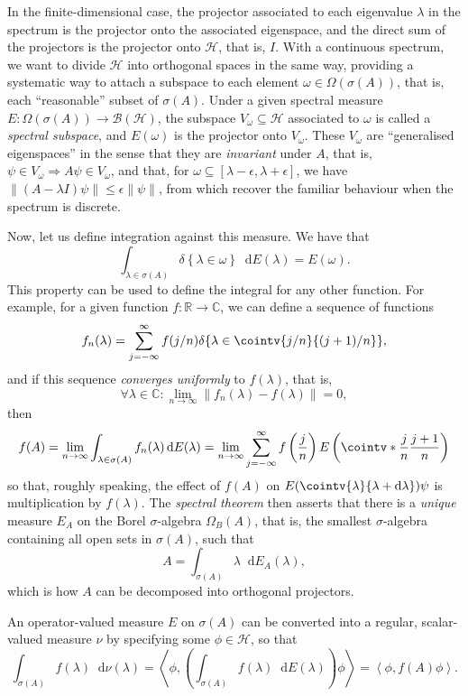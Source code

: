 \documentclass[10pt, a4paper]{article}
\numberwithin{equation}{section} %
\theoremstyle{definition}
\theoremstyle{plain}
\newcommand{\norm}[1]{\left\lVert#1\right\rVert}
\newcommand{\dif}{\mathop{}\!\mathrm{d}} %
\newcommand{\?}{\mathrel{?}} %
\newcommand{\R}{\mathbb{R}} %
\newcommand{\C}{\mathbb{C}} %
\newcommand{\angleb}[1]{\left\langle #1 \right\rangle} %
\newcommand{\indic}[1]{\delta{\left\{#1\right\}}} %
\newcommand{\Hs}{\mathcal{H}} %
\begin{document}
\begin{appendices}
      In the finite-dimensional case, the projector associated to each eigenvalue \(\lambda\) in the spectrum is the projector onto the associated eigenspace, and the direct sum of the projectors is the projector onto \(\Hs\), that is, \(I\). With a continuous spectrum, we want to divide \(\Hs\) into orthogonal spaces in the same way, providing a systematic way to attach a subspace to each element \(\omega \in \Omega(\sigma(A))\), that is, each ``reasonable'' subset of \(\sigma(A)\). Under a given spectral measure \(E : \Omega(\sigma(A)) \to \mathcal{B}(\Hs)\), the subspace \(V_{\omega} \subseteq \Hs\) associated to \(\omega\) is called a \emph{spectral subspace}, and \(E(\omega)\) is the projector onto \(V_{\omega}\). These \(V_{\omega}\) are ``generalised eigenspaces'' in the sense that they are \emph{invariant} under \(A\), that is, \(\psi \in V_{\omega} \Rightarrow A\psi \in V_{\omega}\), and that, for \(\omega \subseteq [\lambda - \epsilon, \lambda + \epsilon]\), we have \(\norm{(A - \lambda I)\psi} \leq \epsilon\norm{\psi}\), from which recover the familiar behaviour when the spectrum is discrete.

      Now, let us define integration against this measure. We have that
      \[ \int_{\lambda \in \sigma(A)} \indic{\lambda \in \omega} \dif{E(\lambda)} = E(\omega). \]
      This property can be used to define the integral for any other function. For example, for a given function \(f : \R \to \C\), we can define a sequence of functions
      \[ f_n(\lambda) = \sum_{j = -\infty}^{\infty} f(j/n) \indic{\lambda \in \cointv{j/n}{(j+1)/n}}, \]
      and if this sequence \emph{converges uniformly} to \(f(\lambda)\), that is,
      \[ \forall \lambda \in \C : \lim_{n \to \infty} \norm{f_n(\lambda) - f(\lambda)} = 0, \]
      then
      \[ f(A) = \lim_{n\to\infty} \int_{\lambda \in \sigma(A)} f_n(\lambda) \dif{E(\lambda)} = \lim_{n\to\infty} \sum_{j = -\infty}^{\infty} f\left(\frac{j}{n}\right) E\left(\cointv*{\frac{j}{n}}{\frac{j+1}{n}}\right) \]
      so that, roughly speaking, the effect of \(f(A)\) on \(E(\cointv{\lambda}{\lambda+\dif{\lambda}})\psi\) is multiplication by \(f(\lambda)\). The \emph{spectral theorem} then asserts that there is a \emph{unique} measure \(E_A\) on the Borel \(\sigma\)-algebra \(\Omega_B(A)\), that is, the smallest \(\sigma\)-algebra containing all open sets in \(\sigma(A)\), such that
      \[ A = \int_{\sigma(A)} \lambda \dif{E_A(\lambda)}, \]
      which is how \(A\) can be decomposed into orthogonal projectors.

      An operator-valued measure \(E\) on \(\sigma(A)\) can be converted into a regular, scalar-valued measure \(\nu\) by specifying some \(\phi \in \Hs\), so that
      \[ \int_{\sigma(A)} f(\lambda) \dif{\nu(\lambda)} = \angleb{\phi, \left(\int_{\sigma(A)} f(\lambda) \dif{E(\lambda)}\right) \phi} = \angleb{\phi, f(A) \phi}. \]


\end{appendices}
\end{document}
